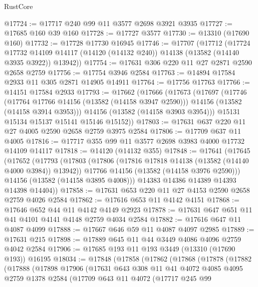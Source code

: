 \begin{lexlean}{RustCore}
\begin{coremodule}
@17724 := @17717 @240 @99 @11 @3577 @2698 @3921 @3935
@17727 := @17685 @160 @39 @160
@17728 := @17727 @3577
@17730 := @13310 (@17690 @160)
@17732 := @17728 @17730 @16945
@17746 := @17707
    (@17712
      (@17724
        @17732
        @14109
        @14117
        (@14120 (@14132 @240))
        @14138
        (@13582 (@14140 @3935 @3922))
        @13942))
@17754 := @17631 @306 @220 @11 @27 @2871 @2590 @2658 @2759
@17756 := @17754 @3946 @2584
@17763 := @14894 @17584 @2933 @11 @305 @2871 @14905 @14911
@17764 := @17756 @17763
@17766 := @14151 @17584 @2933
@17793 := @17662
    (@17666
      (@17673
        (@17697
          (@17746
            (@17764 @17766 @14156 (@13582 (@14158 @3947 @2590)))
            @14156
            (@13582 (@14158 @3914 @3953)))
          @14156
          (@13582 (@14158 @3903 @3954)))
        @15131
        @15134
        @15137
        @15141
        @15146
        @15152))
@17803 := @17631 @637 @220 @11 @27 @4005 @2590 @2658 @2759 @3975 @2584
@17806 := @17709 @637 @11 @4005
@17816 := @17717 @355 @99 @11 @3577 @2698 @3983 @4000 @17732 @14109 @14117
@17818 := @14120 (@14132 @355)
@17848 := @17641
    (@17645
      (@17652
        (@17793
          (@17803
            (@17806 (@17816 @17818 @14138 (@13582 (@14140 @4000 @3984)) @13942))
            @17766
            @14156
            (@13582 (@14158 @3976 @2590)))
          @14156
          (@13582 (@14158 @3895 @4008)))
        @14383
        @14386
        @14389
        @14393
        @14398
        @14404))
@17858 := @17631 @653 @220 @11 @27 @4153 @2590 @2658 @2759 @4026 @2584
@17862 := @17616 @653 @11 @4142 @4151
@17868 := @17646 @652 @44 @11 @4142 @4149 @2923
@17878 := @17631 @647 @651 @11 @41 @4101 @4141 @4148 @2759 @4034 @2584
@17882 := @17616 @647 @11 @4087 @4099
@17888 := @17667 @646 @59 @11 @4087 @4097 @2985
@17889 := @17631 @215
@17898 := @17889 @645 @11 @44 @3449 @4086 @4096 @2759 @4042 @2584
@17906 := @17685 @193 @11 @193 @3449 (@13310 (@17690 @193)) @16195
@18034 := @17848
    (@17858
      (@17862
        (@17868
          (@17878
            (@17882
              (@17888
                (@17898
                  @17906
                  (@17631
                    @643
                    @308
                    @11
                    @41
                    @4072
                    @4085
                    @4095
                    @2759
                    @1378
                    @2584
                    (@17709
                      @643
                      @11
                      @4072
                      (@17717
                        @245
                        @99

\end{coremodule}
\end{lexlean}
